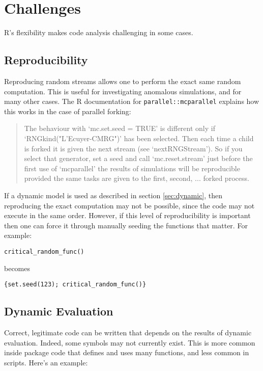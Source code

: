 \documentclass[12pt]{article}
\begin{document}
\section{Challenges}

R's flexibility makes code analysis challenging in some cases.

\subsection{Reproducibility}

Reproducing random streams allows one to perform the exact same random
computation. This is useful for investigating anomalous simulations, and
for many other cases. The R documentation for \texttt{parallel::mcparallel}
explains how this works in the case of parallel forking:

\begin{quote}
     The behaviour with ‘mc.set.seed = TRUE’ is different only if
     ‘RNGkind("L'Ecuyer-CMRG")’ has been selected.  Then each time a child
     is forked it is given the next stream (see ‘nextRNGStream’).  So if
     you select that generator, set a seed and call ‘mc.reset.stream’ just
     before the first use of ‘mcparallel’ the results of simulations will
     be reproducible provided the same tasks are given to the first,
     second, ...  forked process.
\end{quote}

If a dynamic model is used as described in section \ref{sec:dynamic}, then
reproducing the exact computation may not be possible, since the code may not execute in the
same order. However, if this level of reproducibility is important then one
can force it through manually seeding the functions that matter. For
example:
\begin{verbatim}
critical_random_func()
\end{verbatim}
becomes
\begin{verbatim}
{set.seed(123); critical_random_func()}
\end{verbatim}

\subsection{Dynamic Evaluation}

Correct, legitimate code can be written that depends on the results of
dynamic evaluation. Indeed, some symbols may not currently exist. This is
more common inside package code that defines and uses many functions, and
less common in scripts.  Here's an example:
\end{document}
